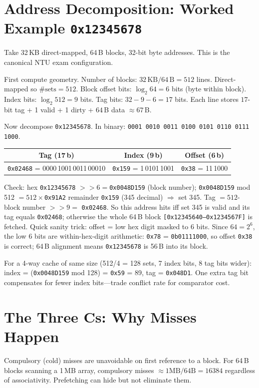\section{Address Decomposition: Worked Example \texttt{0x12345678}}
Take 32\,KB direct-mapped, 64\,B blocks, 32-bit byte addresses. This is the canonical NTU exam configuration.

First compute geometry. Number of blocks: $32\,\text{KB} / 64\,\text{B} = 512$ lines. Direct-mapped so $\text{\#sets}=512$. Block offset bits: $\log_2 64 = 6$ bits (byte within block). Index bits: $\log_2 512 = 9$ bits. Tag bits: $32 - 9 - 6 = 17$ bits. Each line stores $17$-bit tag + 1 valid + 1 dirty + $64$\,B data $\approx 67$\,B.

Now decompose \texttt{0x12345678}. In binary: \texttt{0001\,0010\,0011\,0100\,0101\,0110\,0111\,1000}.
\begin{center}
\small
\begin{tabular}{c|c|c}
Tag (17\,b) & Index (9\,b) & Offset (6\,b) \\ \hline
\texttt{0x02468} = 0000\,1001\,0011\,00010 & \texttt{0x159} = 1\,0101\,1001 & \texttt{0x38} = 11\,1000
\end{tabular}
\end{center}
Check: hex \texttt{0x12345678} $>>6 = $\texttt{0x0048D159} (block number); \texttt{0x0048D159} mod 512 $= 512 \times $\texttt{0x91A2} remainder \texttt{0x159} (345 decimal) $\Rightarrow$ set 345. Tag $= 512$-block number $>>9 =$ \texttt{0x02468}. So this address hits iff set 345 is valid and its tag equals \texttt{0x02468}; otherwise the whole 64\,B block \texttt{[0x12345640--0x1234567F]} is fetched.
Quick sanity trick: offset = low hex digit masked to 6 bits. Since $64=2^6$, the low 6 bits are within-hex-digit arithmetic: \texttt{0x78} = \texttt{0b01111000}, so offset \texttt{0x38} is correct; 64\,B alignment means \texttt{0x12345678} is 56\,B into its block.

For a 4-way cache of same size (512/4 = 128 sets, 7 index bits, 8 tag bits wider): index = (\texttt{0x0048D159} mod 128) = \texttt{0x59} = 89, tag = \texttt{0x048D1}. One extra tag bit compensates for fewer index bits---trade conflict rate for comparator cost.

\section{The Three Cs: Why Misses Happen}
Compulsory (cold) misses are unavoidable on first reference to a block. For 64\,B blocks scanning a 1\,MB array, compulsory misses $\approx 1\text{MB}/64\text{B}=16384$ regardless of associativity. Prefetching can hide but not eliminate them.

